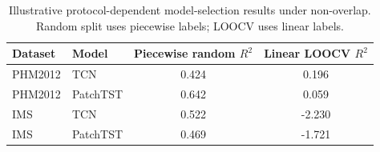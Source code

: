\begin{table}[!ht]
\centering
\caption{Illustrative protocol-dependent model-selection results under non-overlap. Random split uses piecewise labels; LOOCV uses linear labels.}
\label{tab:deployment_selection_nonoverlap}
\small
\begin{tabular}{llcc}
\toprule
Dataset & Model & Piecewise random $R^2$ & Linear LOOCV $R^2$ \\
\midrule
PHM2012 & TCN & 0.424 & 0.196 \\
PHM2012 & PatchTST & 0.642 & 0.059 \\
IMS & TCN & 0.522 & -2.230 \\
IMS & PatchTST & 0.469 & -1.721 \\
\bottomrule
\end{tabular}
\end{table}
